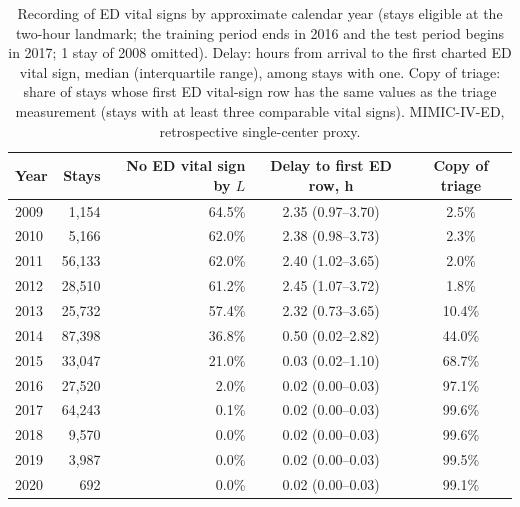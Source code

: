 \begin{table}[t]
\centering
\caption{Recording of ED vital signs by approximate calendar year (stays eligible at the two-hour landmark; the training period ends in 2016 and the test period begins in 2017; 1 stay of 2008 omitted). Delay: hours from arrival to the first charted ED vital sign, median (interquartile range), among stays with one. Copy of triage: share of stays whose first ED vital-sign row has the same values as the triage measurement (stays with at least three comparable vital signs). MIMIC-IV-ED, retrospective single-center proxy.}
\label{tab:recording}
\begin{tabular}{lrrcc}
\toprule
Year & Stays & No ED vital sign by $L$ & Delay to first ED row, h & Copy of triage \\
\midrule
2009 & 1,154 & 64.5\% & 2.35 (0.97--3.70) & 2.5\% \\
2010 & 5,166 & 62.0\% & 2.38 (0.98--3.73) & 2.3\% \\
2011 & 56,133 & 62.0\% & 2.40 (1.02--3.65) & 2.0\% \\
2012 & 28,510 & 61.2\% & 2.45 (1.07--3.72) & 1.8\% \\
2013 & 25,732 & 57.4\% & 2.32 (0.73--3.65) & 10.4\% \\
2014 & 87,398 & 36.8\% & 0.50 (0.02--2.82) & 44.0\% \\
2015 & 33,047 & 21.0\% & 0.03 (0.02--1.10) & 68.7\% \\
2016 & 27,520 & 2.0\% & 0.02 (0.00--0.03) & 97.1\% \\
2017 & 64,243 & 0.1\% & 0.02 (0.00--0.03) & 99.6\% \\
2018 & 9,570 & 0.0\% & 0.02 (0.00--0.03) & 99.6\% \\
2019 & 3,987 & 0.0\% & 0.02 (0.00--0.03) & 99.5\% \\
2020 & 692 & 0.0\% & 0.02 (0.00--0.03) & 99.1\% \\
\bottomrule
\end{tabular}
\end{table}
